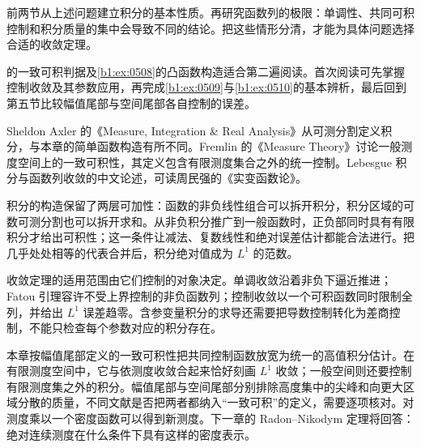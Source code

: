 \ProseParagraphBreak

前两节从上述问题建立积分的基本性质。再研究函数列的极限：单调性、共同可积控制和积分质量的集中会导致不同的结论。把这些情形分清，才能为具体问题选择合适的收敛定理。

\ProseParagraphBreak

的一致可积判据及\cref{b1:ex:0508}的凸函数构造适合第二遍阅读。首次阅读可先掌握控制收敛及其参数应用，再完成\cref{b1:ex:0509}与\cref{b1:ex:0510}的基本辨析，最后回到第五节比较幅值尾部与空间尾部各自控制的误差。

\ProseParagraphBreak

Sheldon Axler 的《Measure, Integration \& Real Analysis》\cite[Chapter 3]{Axler2020Measure}从可测分割定义积分，与本章的简单函数构造有所不同。Fremlin 的《Measure Theory》\cite[Volume 2, \S246]{Fremlin2016Measure}讨论一般测度空间上的一致可积性，其定义包含有限测度集合之外的统一控制。Lebesgue 积分与函数列收敛的中文论述，可读周民强的《实变函数论》\cite{Zhou2016Shibianhanshulun}。







\begin{chaptersummary}
积分的构造保留了两层可加性：函数的非负线性组合可以拆开积分，积分区域的可数可测分割也可以拆开求和。从非负积分推广到一般函数时，正负部同时具有有限积分才给出可积性；这一条件让减法、复数线性和绝对误差估计都能合法进行。把几乎处处相等的代表合并后，积分绝对值成为 \(L^1\) 的范数。

\ProseParagraphBreak

收敛定理的适用范围由它们控制的对象决定。单调收敛沿着非负下逼近推进；Fatou 引理容许不受上界控制的非负函数列；控制收敛以一个可积函数同时限制全列，并给出 \(L^1\) 误差趋零。含参变量积分的求导还需要把导数控制转化为差商控制，不能只检查每个参数对应的积分存在。

\ProseParagraphBreak

本章按幅值尾部定义的一致可积性把共同控制函数放宽为统一的高值积分估计。在有限测度空间中，它与依测度收敛合起来恰好刻画 \(L^1\) 收敛；一般空间则还要控制有限测度集之外的积分。幅值尾部与空间尾部分别排除高度集中的尖峰和向更大区域分散的质量，不同文献是否把两者都纳入“一致可积”的定义，需要逐项核对。对测度乘以一个密度函数可以得到新测度。下一章的 Radon--Nikodym 定理将回答：绝对连续测度在什么条件下具有这样的密度表示。
\end{chaptersummary}

